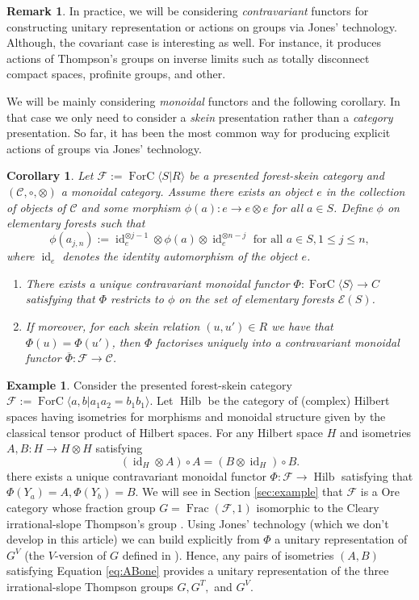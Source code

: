 \documentclass[a4paper, 12pt]{amsart}
\numberwithin{equation}{section}
\newtheorem{corollary}[theorem]{Corollary}
\theoremstyle{definition}
\newtheorem{remark}[theorem]{Remark}
\newtheorem{example}[theorem]{Example}
\newcommand{\cC}{\mathcal C}
\newcommand{\cE}{\mathcal E}
\newcommand{\cF}{\mathcal F}
\DeclareMathOperator{\Frac}{Frac}
\DeclareMathOperator{\FC}{ForC}
\DeclareMathOperator{\Hilb}{Hilb}
\DeclareMathOperator{\id}{id}
\newcommand{\ot}{\otimes}
\newcommand{\ov}{\overline}
\begin{document}
\begin{remark}
In practice, we will be considering {\it contravariant} functors for constructing unitary representation or actions on groups via Jones' technology. Although, the covariant case is interesting as well. For instance, it produces actions of Thompson's groups on inverse limits such as totally disconnect compact spaces, profinite groups, and other.
\end{remark}

We will be mainly considering \textit{monoidal} functors and the following corollary. 
In that case we only need to consider a {\it skein} presentation rather than a {\it category} presentation. 
So far, it has been the most common way for producing explicit actions of groups via Jones' technology.

\begin{corollary}
Let $\cF:=\FC\langle S| R\rangle$ be a presented forest-skein category and $(\cC,\circ,\ot)$ a monoidal category.
Assume there exists an object $e$ in the collection of objects of $\cC$ and some morphism $\phi(a):e\to e \ot e$ for all $a\in S$.
Define $\phi$ on elementary forests such that 
$$\phi(a_{j,n}):= \id_e^{\ot j-1}\ot \phi(a)\ot \id_e^{\ot n-j} \text{ for all } a\in S, 1\leq j\leq n,$$
where $\id_e$ denotes the identity automorphism of the object $e$.

\begin{enumerate}
\item There exists a unique contravariant monoidal functor $\Phi: \FC\langle S\rangle\to C$ satisfying that $\Phi$ restricts to $\phi$ on the set of elementary forests $\cE(S)$.
\item If moreover, for each skein relation $(u,u')\in R$ we have that $\Phi(u)=\Phi(u')$, then $\Phi$ factorises uniquely into a contravariant monoidal functor $\ov\Phi:\cF\to \cC$.
\end{enumerate}
\end{corollary}

\begin{example}
Consider the presented forest-skein category $\cF:=\FC \langle a,b | a_1a_{2}=b_1b_{1}\rangle.$
Let $\Hilb$ be the category of (complex) Hilbert spaces having isometries for morphisms and monoidal structure given by the classical tensor product of Hilbert spaces. 
For any Hilbert space $H$ and isometries $A,B:H\to H\ot H$ satisfying
 \begin{equation}\label{eq:ABone}(\id_H\ot A)\circ A = (B\ot \id_H)\circ B.\end{equation}
 there exists a unique contravariant monoidal functor $\Phi:\cF\to \Hilb$ satisfying that $\Phi(Y_a)=A, \Phi(Y_b)=B.$
We will see in Section \ref{sec:example} that $\cF$ is a Ore category whose fraction group $G=\Frac(\cF,1)$ isomorphic to the Cleary irrational-slope Thompson's group \cite{Cleary00}.
Using Jones' technology (which we don't develop in this article) we can build explicitly from $\Phi$ a unitary representation of $G^V$ (the $V$-version of $G$ defined in \cite{Burillo-Nucinkis-Reeves22}).
Hence, any pairs of isometries $(A,B)$ satisfying Equation \ref{eq:ABone} provides a unitary representation of the three irrational-slope Thompson groups $G,G^T,$ and $G^V$.
\end{example}
\end{document}
